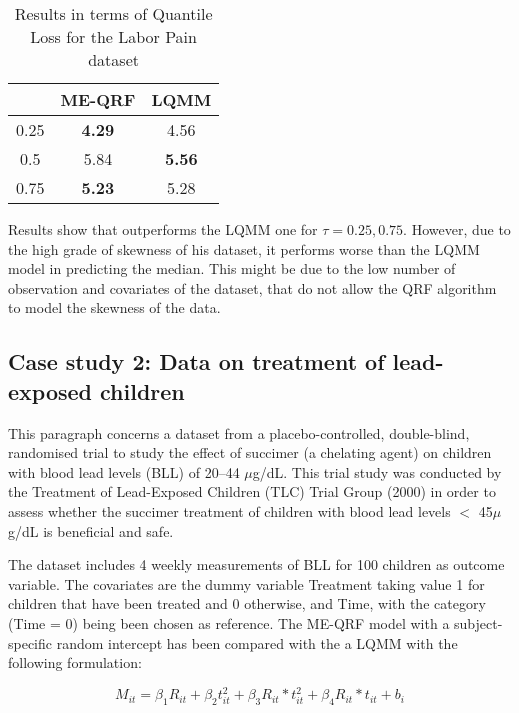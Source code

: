 \begin{table}[H]
\centering
\begin{tabular}{@{}ccc@{}}
\toprule
\cellcolor[HTML]{FFFFFF}{\color[HTML]{333333} $\tau$} & \textbf{ME-QRF} & \textbf{LQMM} \\ \midrule
0.25                                                  & \textbf{4.29}        & 4.56       \\
0.5                                                   & 5.84        & \textbf{5.56}    \\
0.75                                                  & \textbf{5.23}    & 5.28      \\ \bottomrule
\end{tabular}
\caption{Results in terms of Quantile Loss for the Labor Pain dataset}
\label{tab:painlabor}
\end{table}

Results show that  outperforms the LQMM one for $\tau=0.25, 0.75$. However, due to the high grade of skewness of his dataset, it performs worse than the LQMM model in predicting the median. This might be due to the low number of observation and covariates of the dataset, that do not allow the QRF algorithm to model the skewness of the data.


\subsection{Case study 2: Data on treatment of lead-exposed children}

This paragraph concerns a dataset from a placebo-controlled, double-blind, randomised trial to study the effect of succimer (a chelating agent) on children with blood lead levels (BLL) of 20–44 $\mu$g/dL. This trial study was conducted by the Treatment of Lead-Exposed Children (TLC) Trial Group (2000) in order to assess whether the succimer treatment of children with blood lead levels $<$ 45$\mu$g/dL is beneficial and safe.

The dataset includes 4 weekly measurements of BLL for 100 children as outcome variable. The covariates are the dummy variable Treatment taking value 1 for children that have been treated and 0 otherwise, and Time, with the category (Time = 0) being
been chosen as reference.
The ME-QRF model with a subject-specific random intercept has been compared with the a LQMM with the following formulation: 

\begin{equation}
    M_{it}=\beta_1 R_{it} + \beta_2 t^2_{it}+ \beta_3 R_{it}*t^2_{it} + \beta_4 R_{it} * t_{it} + b_i
\end{equation}

